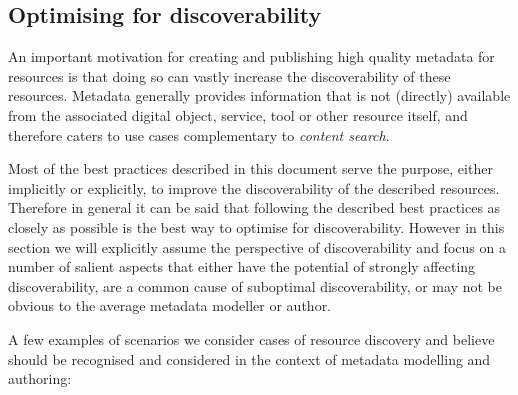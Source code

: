\begin{workinprogress}

\section{Optimising for
discoverability}\label{optimising-for-discoverability}


An important motivation for creating and publishing high quality metadata for resources is that doing so can vastly increase the discoverability of these resources. Metadata generally provides information that is not (directly) available from the associated digital object, service, tool or other resource itself, and therefore caters to use cases complementary to \emph{content search}.

Most of the best practices described in this document serve the purpose, either implicitly or explicitly, to improve the discoverability of the described resources. Therefore in general it can be said that following the described best practices as closely as possible is the best way to optimise for discoverability. However in this section we will explicitly assume the perspective of discoverability and focus on a number of salient aspects that either have the potential of strongly affecting discoverability, are a common cause of suboptimal discoverability, or may not be obvious to the average metadata modeller or author.

A few examples of scenarios we consider cases of resource discovery and believe should be recognised and considered in the context of metadata modelling and authoring: 


\end{workinprogress}

